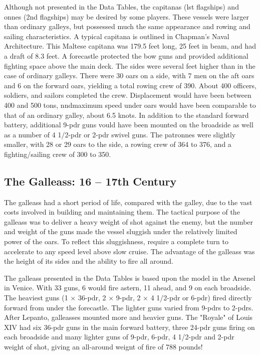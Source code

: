 \documentclass{article}
\begin{document}
\begin{multicols}{3}
Although not presented in the Data Tables, the capitanas (lst
flagships) and onnes (2nd flagships) may be desired by some players.
These vessels were larger than ordinary galleys, but possessed much
the same appearance and rowing and sailing characteristics.  A typical
capitana is outlined in Chapman's Naval Architecture.  This Maltese
capitana was 179.5 feet long, 25 feet in beam, and had a draft of 8.3
feet.  A forecastle protected the bow guns and provided additional
fighting space above the main deck.  The sides were several feet
higher than in the case of ordinary galleys.  There were 30 oars on a
side, with 7 men on the aft oars and 6 on the forward oars, yielding a
total rowing crew of 390.  About 400 officers, soldiers, and sailors
completed the crew.  Displacement would have been between 400 and 500
tons, nndmaximum speed under oars would have been comparable to that
of an ordinary galley, about 6.5 knots.  In addition to the standard
forward battery, additional 9-pdr guns vould have been mounted on the
broadside as well as a number of 4 1/2-pdr or 2-pdr swivel guns.  The
patronnes were slightly smaller, with 28 or 29 oars to the side, a
rowing crew of 364 to 376, and a fighting/sailing crew of 300 to 350.

\subsection{The Galleass:  16 -- 17th Century}

The galleass had a short period of life, compared with the galley, due
to the vast costs involved in building and maintaining them.  The
tactical purpose of the galleass was to deliver a heavy weight of shot
against the enemy, but the number and weight of the guns made the
vessel sluggish under the relatively limited power of the oars. To
reflect this sluggishness, require a complete turn to accelerate to
any speed level above slow cruise.  The advantage of the galleass was
the height of its sides and the ability to fire all around.

The galleass presented in the Data Tables is based upon the model in
the Arsenel in Venice.  With 33 guns, 6 would fire astern, 11 ahead,
and 9 on each broadside.  The heaviest guns (1 × 36-pdr, 2 × 9-pdr, 2
× 4 1/2-pdr or 6-pdr) fired directly forward from under the
forecastle.  The lighter guns varied from 9-pdrs to 2-pdrs.  After
Lepanto, galleasses mounted more and heavier guns.  The "Royale" of
Louis XIV had six 36-pdr guns in the main forward battery, three
24-pdr guns firing on each broadside and many lighter guns of 9-pdr,
6-pdr, 4 1/2-pdr and 2-pdr weight of shot, giving an all-around
weignt of fire of 788 pounds!


\end{multicols}
\end{document}
